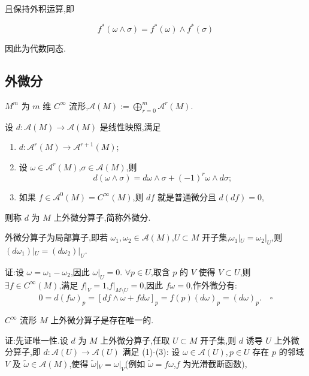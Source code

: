 且保持外积运算,即

\[
f^*(\omega \wedge \sigma) = f^*(\omega) \wedge f^*(\sigma)
\]

因此为代数同态.

\subsection{外微分}

$M^m$ 为 $m$ 维 $C^\infty$ 流形,$\mathcal{A}(M) := \bigoplus_{r=0}^m \mathcal{A}^r(M)$.

\begin{definition}
设 $d : \mathcal{A}(M) \rightarrow \mathcal{A}(M)$ 是线性映照,满足
\begin{enumerate}
    \item $d : \mathcal{A}^r(M) \rightarrow \mathcal{A}^{r+1}(M)$;
    \item 设 $\omega \in \mathcal{A}^r(M)$,$\sigma \in \mathcal{A}(M)$,则
    \[
    d(\omega \wedge \sigma) = d\omega \wedge \sigma + (-1)^r \omega \wedge d\sigma;
    \]
    \item 如果 $f \in \mathcal{A}^0(M) = C^\infty(M)$,则 $df$ 就是普通微分且 $d(df) = 0$,
\end{enumerate}
则称 $d$ 为 $M$ 上外微分算子,简称外微分.
\end{definition}

\begin{lemma}
外微分算子为局部算子,即若 $\omega_1, \omega_2 \in \mathcal{A}(M)$,$U \subset M$ 开子集,$\omega_1|_U = \omega_2|_U$,则 $(d\omega_1)|_U = (d\omega_2)|_U$.
\end{lemma}

证:设 $\omega = \omega_1 - \omega_2$,因此 $\omega|_U = 0$.
$\forall p \in U$,取含 $p$ 的 $V$ 使得 $V \subset U$,则 $\exists f \in C^\infty(M)$,满足 $f|_V = 1$,$f|_{M\setminus U} = 0$,因此 $f\omega = 0$,作外微分有:
\[
0 = d(f\omega)_p = [df \wedge \omega + f d\omega]_p = f(p)(d\omega)_p = (d\omega)_p. \quad \square
\]

\begin{theorem}
$C^\infty$ 流形 $M$ 上外微分算子是存在唯一的.
\end{theorem}

证:先证唯一性.设 $d$ 为 $M$ 上外微分算子,任取 $U \subset M$ 开子集,则 $d$ 诱导 $U$ 上外微分算子,即 $d: \mathcal{A}(U) \rightarrow \mathcal{A}(U)$ 满足 (1)-(3):
设 $\omega \in \mathcal{A}(U), p \in U$ 存在 $p$ 的邻域 $V$ 及 $\tilde{\omega} \in \mathcal{A}(M)$,使得 $\tilde{\omega}|_V = \omega|_V$(例如 $\tilde{\omega} = f\omega$,$f$ 为光滑截断函数),

